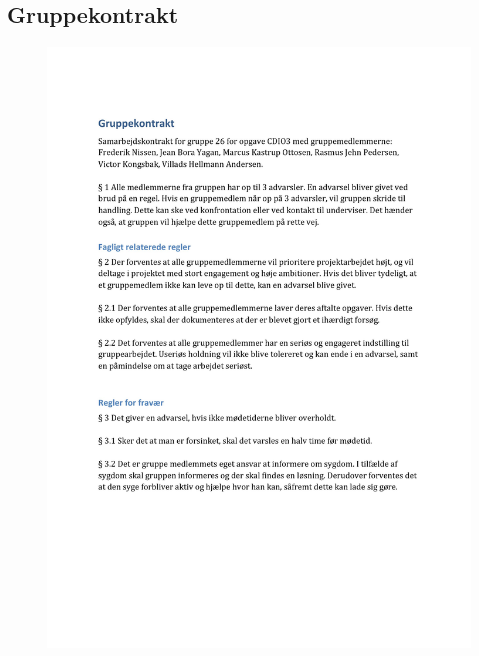 \subsection{Gruppekontrakt}
\begin{figure}[H]
    \centering
    \includegraphics[width=17cm]{figures/Gruppekontrakt1.jpg}
\end{figure}
